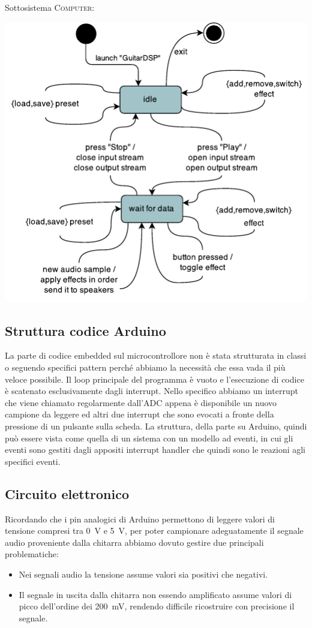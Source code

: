 \documentclass[a4paper,11pt]{article}
\begin{document}
\noindent
Sottosistema \textsc{Computer}:

\vspace{3mm}

\includegraphics[width=\textwidth]{stati2.pdf}

\subsection{Struttura codice Arduino}
La parte di codice embedded sul microcontrollore non è stata strutturata in classi o seguendo specifici pattern perché abbiamo la necessità che essa vada il più veloce possibile. Il loop principale del programma è vuoto e l'esecuzione di codice è scatenato esclusivamente dagli interrupt. Nello specifico abbiamo un interrupt che viene chiamato regolarmente dall'ADC appena è disponibile un nuovo campione da leggere ed altri due interrupt che sono evocati a fronte della pressione di un pulsante sulla scheda. La struttura, della parte su Arduino, quindi può essere vista come quella di un sistema con un modello ad eventi, in cui gli eventi sono gestiti dagli appositi interrupt handler che quindi sono le reazioni agli specifici eventi.

\subsection{Circuito elettronico}
Ricordando che i pin analogici di Arduino permettono di leggere valori di tensione compresi tra \SI{0}{\volt} e \SI{5}{\volt}, per poter campionare adeguatamente il segnale audio proveniente dalla chitarra abbiamo dovuto gestire due principali problematiche:
\begin{itemize}
    \item Nei segnali audio la tensione assume valori sia positivi che negativi.
    \item Il segnale in uscita dalla chitarra non essendo amplificato assume valori di picco dell'ordine dei \SI{200}{\milli\volt}, rendendo difficile ricostruire con precisione il segnale.
\end{itemize}
\end{document}
